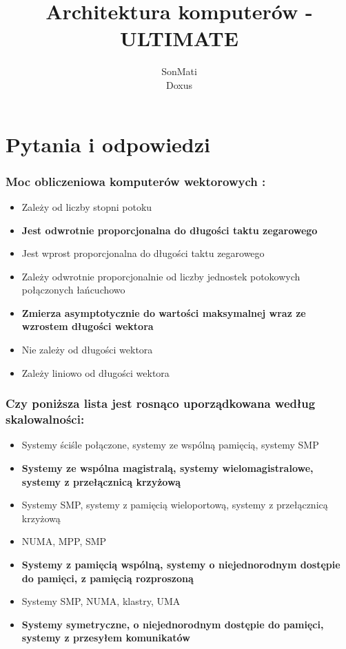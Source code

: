 \documentclass[a4paper,twoside]{article}
\begin{document}


\begin{titlepage}
\title{\huge Architektura komputerów - ULTIMATE}
\author{\large SonMati \\ Doxus}
\maketitle
\end{titlepage}

\part*{Pytania i odpowiedzi}
\section{Moc obliczeniowa komputerów wektorowych :}
	\begin{itemize}
    \item Zależy od liczby stopni potoku
    \item \textbf{Jest odwrotnie proporcjonalna do długości taktu zegarowego}
    \item Jest wprost proporcjonalna do długości taktu zegarowego
    \item Zależy odwrotnie proporcjonalnie od liczby jednostek potokowych połączonych łańcuchowo
    \item \textbf{Zmierza asymptotycznie do wartości maksymalnej wraz ze wzrostem długości wektora}
    \item Nie zależy od długości wektora
    \item Zależy liniowo od długości wektora
    \end{itemize}

\section{Czy poniższa lista jest rosnąco uporządkowana według skalowalności:}
	\begin{itemize}
    \item Systemy ściśle połączone, systemy ze wspólną pamięcią, systemy SMP
    \item \textbf{Systemy ze wspólna magistralą, systemy wielomagistralowe, systemy z przełącznicą krzyżową}
    \item Systemy SMP, systemy z pamięcią wieloportową, systemy z przełącznicą krzyżową
    \item NUMA, MPP, SMP
    \item \textbf{Systemy z pamięcią wspólną, systemy o niejednorodnym dostępie do pamięci, z pamięcią rozproszoną}
    \item Systemy SMP, NUMA, klastry, UMA
    \item \textbf{Systemy symetryczne, o niejednorodnym dostępie do pamięci, systemy z przesyłem komunikatów}
    \end{itemize}
    
\end{document}

